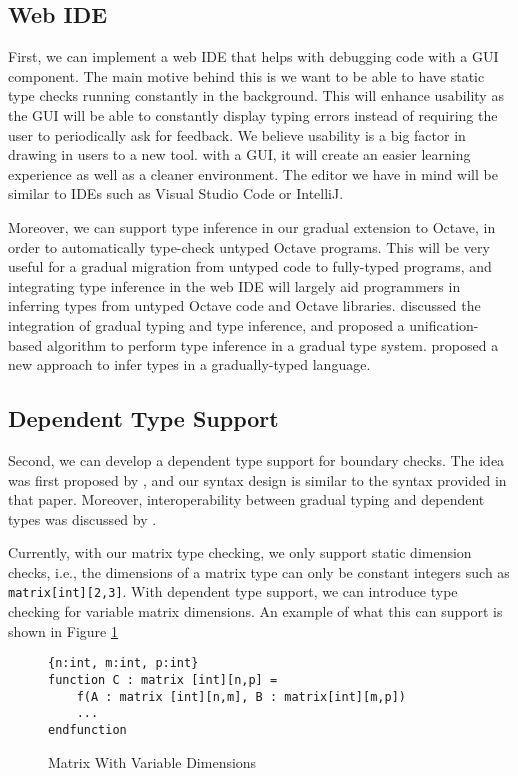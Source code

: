 \subsection{Web IDE}
First, we can implement a web IDE that helps with debugging code with a GUI component. The main motive behind this is we want to be able to have static type checks running constantly in the background. This will enhance usability as the GUI will be able to constantly display typing errors instead of requiring the user to periodically ask for feedback. We believe usability is a big factor in drawing in users to a new tool. with a GUI, it will create an easier learning experience as well as a cleaner environment. The editor we have in mind will be similar to IDEs such as Visual Studio Code or IntelliJ.

Moreover, we can support type inference in our gradual extension to Octave, in order to automatically type-check untyped Octave programs. This will be very useful for a gradual migration from untyped code to fully-typed programs, and integrating type inference in the web IDE will largely aid programmers in inferring types from untyped Octave code and Octave libraries. \citet{siek2008gradual} discussed the integration of gradual typing and type inference, and proposed a unification-based algorithm to perform type inference in a gradual type system. \citet{garcia2015principal} proposed a new approach to infer types in a gradually-typed language. 

\subsection{Dependent Type Support}
Second, we can develop a dependent type support for boundary checks. The idea was first proposed by \citet{xi1998eliminating}, and our syntax design is similar to the syntax provided in that paper. Moreover, interoperability between gradual typing and dependent types was discussed by \citet{lehmann2017gradual}.

Currently, with our matrix type checking, we only support static dimension checks, i.e., the dimensions of a matrix type can only be constant integers such as {\tt matrix[int][2,3]}. With dependent type support, we can introduce type checking for variable matrix dimensions. An example of what this can support is shown in Figure \ref{fig:variableDimensions}

\begin{figure}[h]
    \begin{lstlisting}[language=racket]
{n:int, m:int, p:int}
function C : matrix [int][n,p] = 
    f(A : matrix [int][n,m], B : matrix[int][m,p])
	...
endfunction
    \end{lstlisting}
    \caption[]{{Matrix With Variable Dimensions}}
    \label{fig:variableDimensions}
\end{figure}

